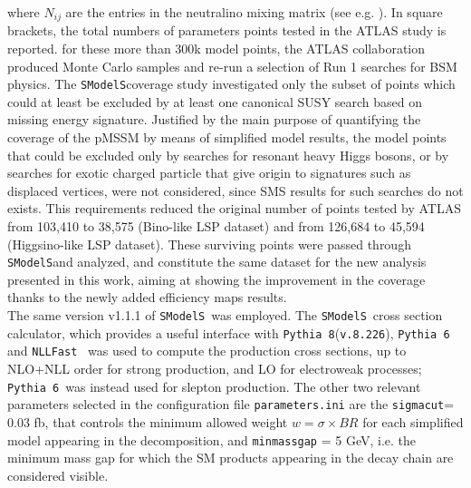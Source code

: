 \documentclass[preprint,number,sort&compress,twocolumn,3p]{elsstyarticle}
\newcommand{\SMO}{\texttt{SModelS\xspace}}
\begin{document}
where $N_{ij}$ are the entries in the neutralino mixing matrix (see e.g. \cite{Martin:1997ns}). In square brackets, the total numbers of parameters points tested in the ATLAS study is reported. for these more than 300k model points, the ATLAS collaboration produced Monte Carlo samples and re-run a selection of Run 1 searches for BSM physics. The \SMO coverage study investigated only the subset of points which could at least be excluded by at least one canonical SUSY search based on missing energy signature. Justified by the main purpose of quantifying the coverage of the pMSSM by means of simplified model results, the model points that could be excluded only by searches for resonant heavy Higgs bosons, or by searches for exotic charged particle that give origin to signatures such as displaced vertices, were not considered, since SMS results for such searches do not exists.
This requirements reduced the original number of points tested by ATLAS from 103,410 to 38,575 (Bino-like LSP dataset) and from 126,684 to 45,594 (Higgsino-like LSP dataset). These surviving points were passed through \SMO and analyzed, and constitute the same dataset for the new analysis presented in this work, aiming at showing the improvement in the coverage thanks to the newly added efficiency maps results. 
\\
The same version v1.1.1 of \SMO~was employed. The \SMO~cross section calculator, which provides a useful interface with \texttt{Pythia 8}(\texttt{v.8.226})\cite{Sjostrand:2014zea}, \texttt{Pythia 6}\cite{Sjostrand:2006za} and \texttt{NLLFast}~\cite{nllfast,Beenakker:1996ch,Kulesza:2008jb,Kulesza:2009kq,Beenakker:2009ha,Beenakker:2011fu,Beenakker:1997ut,Beenakker:2010nq} was used to compute the production cross sections, up to NLO+NLL order for strong production, and LO for electroweak processes; \texttt{Pythia 6}~was instead used for slepton production. The other two relevant parameters selected in the configuration file \texttt{parameters.ini} are the \texttt{sigmacut}= 0.03 fb, that controls the  minimum allowed weight  $w = \sigma \times BR$ for each simplified model appearing in the decomposition, and \verb|minmassgap| = 5 GeV, i.e. the minimum mass gap for which the SM products appearing in the decay chain are considered visible. 
%
\end{document}
